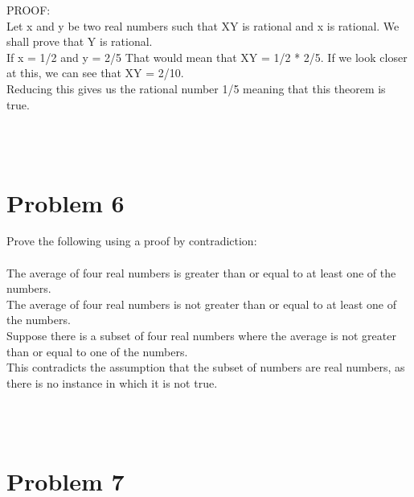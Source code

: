 \begin{enumerate}
PROOF: \\

Let x and y be two real numbers such that XY is rational and x is rational. We shall prove that Y is rational. \\

If x = 1/2 and y = 2/5 That would mean that XY =  1/2 * 2/5. If we look closer at this, we can see that XY = 2/10. \\

Reducing this gives us the rational number 1/5 meaning that this theorem is true.





\\\\




 \newpage

\section*{Problem 6}
Prove the following using a proof by contradiction:
\\\\


The average of four real numbers is greater than or equal to at least one of the numbers. \\

The average of four real numbers is not greater than or equal to at least one of the numbers. \\

Suppose there is a subset of four real numbers where the average is not greater than or equal to one of the numbers. \\

This contradicts the assumption that the subset of numbers are real numbers, as there is no instance in which it is not true. 

\\\\



 \newpage

\section*{Problem 7}


\end{enumerate}
